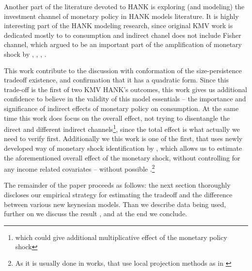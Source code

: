 \documentclass[12pt]{article}
\begin{document}
Another part of the literature devoted to HANK is exploring (and modeling) the investment channel of monetary policy in HANK models literature. 
It is highly interesting part of the HANK modeling research, since original KMV work is dedicated mostly to to consumption and indirect chanel does not include Fisher channel, which argued to be an important part of the amplification of monetary shock by \citet{Luetticke2021}, \citet{OttonelloWinberry2020}, \citet{AuclertRognlieStraub2020}, \citet{BilbiieKanzigSurico2021}.





This work contribute to the discussion with conformation of the size-persistence tradeoff existence, and confirmation that it has a quadratic form.
Since this trade-off is the first of two KMV HANK's outcomes, this work gives us additional confidence to believe in the validity of this model essentials -- the importance and significance of indirect effects of monetary policy on consumption.
At the same time this work does focus on the overall effect, not trying to disentangle the direct and different indirect channels\footnote{which could give additional multiplicative effect of the monetary policy shock}, since the total effect is what actually we need to verify first.
Additionally we this work is one of the first, that uses newly developed way of monetary shock identification by \citet{BRW2021}, which allows us to estimate the aforementioned overall effect of the monetary shock, without controlling for any income related covariates -- without possible .\footnote{As it is usually done in works, that use local projection methods as in \citet{HolmPaulTischbirek2020}}





The remainder of the paper proceeds as follows: 
the next section thoroughly discloses our empirical strategy for estimating the tradeoff and the difference between various new keynesian models.
Than we describe data being used, further on we discuss the result , and at the end we conclude.







\newpage
{}
\newpage
\appendix
{}
\end{document}
